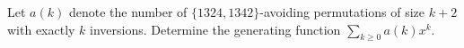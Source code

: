 Let $a(k)$ denote the number of $\{1324, 1342\}$-avoiding permutations of size $k+2$ with exactly $k$ inversions. Determine the generating function $\sum_{k \geq 0} a(k) x^k$.
